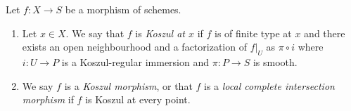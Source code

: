\begin{definition}
\label{definition-lci}
Let $f : X \to S$ be a morphism of schemes.
\begin{enumerate}
\item Let $x \in X$. We say that $f$ is {\it Koszul at $x$} if $f$
is of finite type at $x$ and there exists an open neighbourhood
and a factorization of $f|_U$ as $\pi \circ i$ where $i : U \to P$
is a Koszul-regular immersion and $\pi : P \to S$ is smooth.
\item We say $f$ is a {\it Koszul morphism}, or that
$f$ is a {\it local complete intersection morphism}
if $f$ is Koszul at every point.
\end{enumerate}
\end{definition}